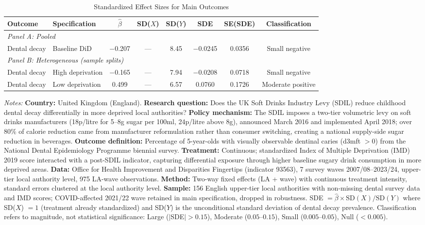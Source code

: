 \begin{table}[H]
\centering
\caption{Standardized Effect Sizes for Main Outcomes}
\label{tab:sde}
\begin{adjustbox}{max width=\textwidth}
\begin{tabular}{llcccccc}
\toprule
Outcome & Specification & $\hat{\beta}$ & SD($X$) & SD($Y$) & SDE & SE(SDE) & Classification \\
\midrule
\multicolumn{8}{l}{\textit{Panel A: Pooled}} \\
Dental decay & Baseline DiD & $-$0.207 & --- & 8.45 & $-$0.0245 & 0.0356 & Small negative \\
\midrule
\multicolumn{8}{l}{\textit{Panel B: Heterogeneous (sample splits)}} \\
Dental decay & High deprivation & $-$0.165 & --- & 7.94 & $-$0.0208 & 0.0718 & Small negative \\
Dental decay & Low deprivation & 0.499 & --- & 6.57 & 0.0760 & 0.1726 & Moderate positive \\
\bottomrule
\end{tabular}
\end{adjustbox}
\par\vspace{0.3em}
{\footnotesize \textit{Notes:}
\textbf{Country:} United Kingdom (England).
\textbf{Research question:} Does the UK Soft Drinks Industry Levy (SDIL) reduce childhood dental decay differentially in more deprived local authorities?
\textbf{Policy mechanism:} The SDIL imposes a two-tier volumetric levy on soft drinks manufacturers (18p/litre for 5--8g sugar per 100ml, 24p/litre above 8g), announced March 2016 and implemented April 2018; over 80\% of calorie reduction came from manufacturer reformulation rather than consumer switching, creating a national supply-side sugar reduction in beverages.
\textbf{Outcome definition:} Percentage of 5-year-olds with visually observable dentinal caries (d3mft $> 0$) from the National Dental Epidemiology Programme biennial survey.
\textbf{Treatment:} Continuous; standardized Index of Multiple Deprivation (IMD) 2019 score interacted with a post-SDIL indicator, capturing differential exposure through higher baseline sugary drink consumption in more deprived areas.
\textbf{Data:} Office for Health Improvement and Disparities Fingertips (indicator 93563), 7 survey waves 2007/08--2023/24, upper-tier local authority level, 975 LA-wave observations.
\textbf{Method:} Two-way fixed effects (LA + wave) with continuous treatment intensity, standard errors clustered at the local authority level.
\textbf{Sample:} 156 English upper-tier local authorities with non-missing dental survey data and IMD scores; COVID-affected 2021/22 wave retained in main specification, dropped in robustness.
SDE $= \hat{\beta} \times \text{SD}(X) / \text{SD}(Y)$ where SD($X$) $= 1$ (treatment already standardized) and SD($Y$) is the unconditional standard deviation of dental decay prevalence.
Classification refers to magnitude, not statistical significance:
Large ($|$SDE$| > 0.15$), Moderate ($0.05$--$0.15$), Small ($0.005$--$0.05$), Null ($< 0.005$).}
\end{table}
